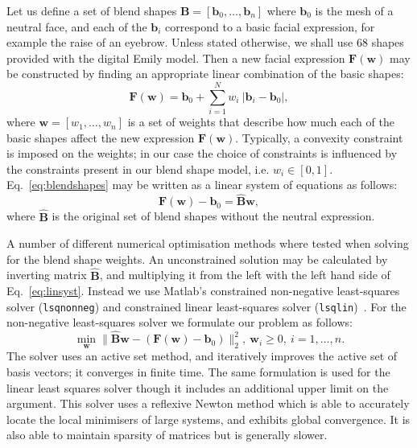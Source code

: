 \documentclass[11pt]{report}
\newcommand{\w}{\mathbf{w}}
\newcommand{\F}{\mathbf{F}}
\newcommand{\bb}{\mathbf{b}}
\begin{document}
Let us define a set of blend shapes $\mathbf{B} = [\bb_0, \ldots, \bb_n]$ where $\bb_0$ is the mesh of a neutral face, and each of the $\bb_i$ correspond to a basic facial expression, for example the raise of an eyebrow. Unless stated otherwise, we shall use $68$ shapes provided with the digital Emily model. Then a new facial expression $\mathbf{F(\w)}$ may be constructed by finding an appropriate linear combination of the basic shapes:
\begin{equation}
	\F(\w) = \bb_0 + \sum_{i=1}^N w_i \: |\bb_i - \bb_0|, \label{eq:blendshapes}
\end{equation} where $\w = [w_1, \ldots, w_n]$ is a set of weights that describe how much each of the basic shapes affect the new expression $\mathbf{F(\w)}$. Typically, a convexity constraint is imposed on the weights; in our case the choice of constraints is influenced by the constraints present in our blend shape model, i.e. $w_i \in [0,1]$. Eq.~\ref{eq:blendshapes} may be written as a linear system of equations as follows:
\begin{equation}
	\F(\w) - \bb_0 = \hat{\mathbf{B}} \w, \label{eq:linsyst}
\end{equation} where $\hat{\mathbf{B}}$ is the original set of blend shapes without the neutral expression. 

A number of different numerical optimisation methods where tested when solving for the blend shape weights. An unconstrained solution may be calculated by inverting matrix $\hat{\mathbf{B}}$, and multiplying it from the left with the left hand side of Eq.~\ref{eq:linsyst}. Instead we use Matlab's constrained non-negative least-squares solver (\texttt{lsqnonneg}) and constrained linear least-squares solver (\texttt{lsqlin})~\cite{Matlab}. For the non-negative least-squares solver we formulate our problem as follows:
\begin{equation}
	\min_\w \| \hat{\mathbf{B}} \w - (\F(\w) - \bb_0) \|_2^2, \: \w_i \geq 0, \: i = 1, \ldots, n. \label{eq:lsqnonneg}
\end{equation} The solver uses an active set method, and iteratively improves the active set of basis vectors; it converges in finite time. The same formulation is used for the linear least squares solver though it includes an additional upper limit on the argument. This solver uses a reflexive Newton method which is able to accurately locate the local minimisers of large systems, and exhibits global convergence. It is also able to maintain sparsity of matrices but is generally slower.
\end{document}
